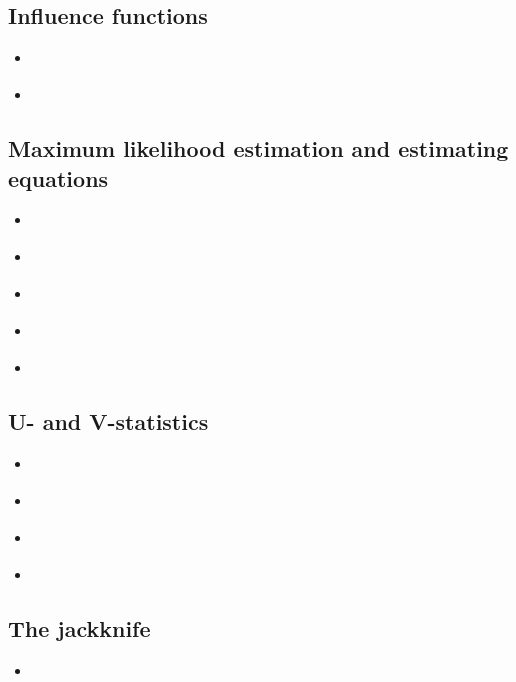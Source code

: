 \documentclass{report}
\begin{document}
\subsection{Influence functions}

\begin{itemize}
    \item \cite[Chapter~2.1]{hampel_robust_2011}
    \item \cite[Chapter~6.3]{lehmann_elements_1999}
\end{itemize}

\subsection{Maximum likelihood estimation and estimating equations}

\begin{itemize}
    \item \cite[Chapter~5]{van_der_vaart_asymptotic_1998}
    \item \cite[Chapters~16-17]{dasgupta_asymptotic_2008}
    \item \cite[Chapter~10.2]{casella_statistical_2002}
    \item \cite[Chapter~2.3]{hampel_robust_2011}
    \item \cite[Chapter~7]{serfling_approximation_1980}
\end{itemize}

\subsection{U- and V-statistics}

\begin{itemize}
    \item \cite[Chapter~12]{van_der_vaart_asymptotic_1998}
    \item \cite[Chapter~15]{dasgupta_asymptotic_2008}
    \item \cite[Chapter~6.1]{lehmann_elements_1999}
    \item \cite[Chapter~5]{serfling_approximation_1980}
\end{itemize}

\subsection{The jackknife}

\begin{itemize}
    \item \cite[Chapter~30]{dasgupta_asymptotic_2008}
\end{itemize}
\end{document}
